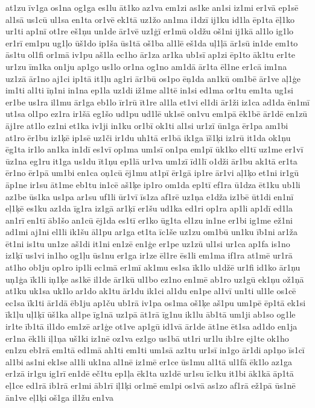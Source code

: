 {at1zu
īv1ga
os1na
og1ga
es1lu
āt1ko
az1va
em1zi
as1ke
an1si
iz1mi
er1vā
ep1sē
al1sā
us1cū
ul1sa
en1ta
or1vē
ek1tā
uz1žo
an1ma
i1dzī
ij1ku
id1la
ēp1ta
ēļ1ko
ur1ti
ap1nī
ot1re
eš1ņu
un1de
ār1vē
uz1ģī
er1mū
o1džu
oš1ni
ij1kā
al1lo
ig1lo
er1rī
em1pu
ug1ļo
ūš1do
ip1ša
ūs1tā
oš1ba
al1lē
eš1da
uļ1ļā
ār1sū
in1de
em1to
ās1tu
ol1fi
or1mā
iv1pu
aš1la
ec1ho
ār1za
ar1ka
ub1sī
ap1zi
ēp1to
āk1tu
er1te
ur1zu
īm1ka
on1ju
ap1go
us1lo
or1na
og1no
am1dā
ār1ta
ēl1ne
er1cā
im1na
uz1zā
ār1no
aj1ci
ip1tā
it1ļu
ag1ri
ār1bū
os1po
ēņ1da
an1kū
om1bē
ār1ve
aļ1ģe
im1ti
al1ti
īņ1ni
in1na
ep1la
uz1di
iž1me
al1tē
in1si
ed1ma
or1tu
em1ta
ug1si
er1be
us1ra
il1mu
ār1ga
eb1lo
īr1rū
īt1re
al1la
et1vi
el1di
ār1ži
iz1ca
ad1da
ēn1mī
ut1sa
ol1po
ez1ra
ir1šā
eg1šo
ud1pu
ud1lē
uk1sē
on1vu
em1pā
ēk1bē
ār1dē
en1zū
āj1re
at1lo
ez1ni
et1ka
iv1ji
in1ku
or1bī
ok1ti
al1si
ur1zī
ūn1ga
ēr1pa
am1bi
at1ro
ēr1bu
iz1ķē
ip1sē
uz1či
ir1du
uh1tā
er1bā
ik1ga
īš1ķi
iz1rū
it1da
ok1ņu
ēg1ta
ir1lo
an1ka
in1dī
es1vī
op1ma
um1sī
on1pa
em1pī
ūk1ko
el1tī
uz1me
er1vī
ūz1na
eg1ru
it1ga
us1du
īt1ņu
ep1lā
ur1va
um1zī
īd1lī
o1dži
ār1bu
ak1tā
er1ta
ēr1no
ēr1pā
um1bi
en1ca
oņ1cū
ēj1mu
at1pī
ēr1gā
ip1re
ār1vi
aļ1ķo
et1ni
ir1gū
āp1ne
ir1su
āt1me
eb1tu
in1cē
aš1ķe
ip1ro
om1da
ep1tī
ef1ra
ū1dza
ēt1ku
ub1li
az1be
ūs1ka
us1pa
ar1su
uf1li
ūr1vī
īs1za
af1rē
uz1ņa
e1dža
iz1bē
ūt1di
en1nī
eļ1ķē
es1ku
az1da
īg1ra
iz1gā
ar1ķī
er1šu
ud1ka
ed1ri
op1ra
ap1li
ap1dī
ed1la
an1rī
en1tī
āb1šo
an1cū
ēj1da
es1tī
er1ko
ūg1ta
el1zu
in1ne
er1bi
ig1me
ež1ni
ad1mi
aj1ni
el1li
ik1šu
āl1pu
ar1ga
et1ta
īc1še
uz1zu
om1bū
un1ku
īb1ni
ar1ža
ēt1ni
is1tu
un1ze
aš1di
it1ni
en1zē
en1ģe
er1pe
uz1zū
ul1si
ur1ca
ap1fa
is1no
iz1ķī
us1vi
in1ho
og1ļu
ūs1nu
er1ga
ir1ze
ēl1re
ēs1li
em1ma
if1ra
at1mē
ur1rā
at1ho
ob1ju
op1ro
ip1li
ec1mā
er1mī
ak1mu
es1sa
īk1lo
u1džē
ur1fi
id1ko
ār1ņu
uņ1ģa
īk1li
iņ1ķe
as1kē
il1de
ār1kū
ul1bo
ez1no
en1mē
ab1ro
uz1gū
ek1ņu
ož1ņā
at1ku
uk1sa
uk1lo
ar1do
ak1tu
ār1du
ik1ci
al1du
en1pe
al1vī
un1ti
ul1le
os1cē
ec1sa
īk1ti
ār1dā
ēb1ju
ap1ču
ub1rā
iv1pa
os1ma
oš1ķe
aš1pu
um1pē
ēp1tā
ek1si
īk1ļu
uļ1ķī
ūš1ka
al1pe
īg1nā
uz1pā
āt1rā
īg1nu
ik1lu
āb1tā
um1ji
ab1so
og1le
ir1te
īb1tā
il1do
em1zē
ar1ģe
ot1ve
ap1gū
id1vā
ār1de
āt1ne
ēt1sa
ad1do
en1ja
er1na
ēk1li
iļ1ņa
uš1ki
iz1nē
oz1va
ez1go
us1bā
ut1ri
ur1lu
ib1re
ej1te
ok1ho
en1zu
eb1rā
em1tā
ed1mā
ah1ti
em1ti
um1sā
az1tu
ur1sī
in1go
ār1di
ap1ņo
īs1cī
al1bi
as1ni
ek1se
al1li
uk1na
al1nē
iz1mē
er1ce
ūs1mu
al1tā
ul1fā
ēk1lo
az1ga
er1zā
ir1gu
ig1rī
en1dē
eč1tu
ep1ļa
ēk1ta
uz1dē
ur1su
īc1ku
it1bi
āk1kā
āp1tā
eļ1ce
ed1rā
ib1rā
er1mi
āb1rī
iļ1ķi
or1mē
em1pi
os1vā
as1zo
af1rā
ež1pā
ūs1nē
ān1ve
eļ1ķi
oš1ga
il1žu
en1va
}
